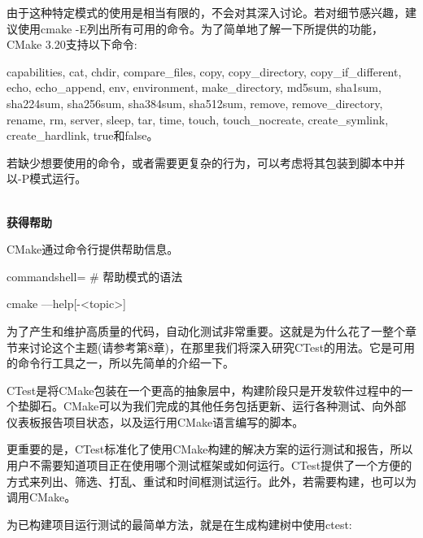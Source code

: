 由于这种特定模式的使用是相当有限的，不会对其深入讨论。若对细节感兴趣，建议使用cmake -E列出所有可用的命令。为了简单地了解一下所提供的功能，CMake 3.20支持以下命令:

capabilities, cat, chdir, compare\_files, copy, copy\_directory, copy\_if\_different, echo, echo\_append, env, environment, make\_directory, md5sum, sha1sum, sha224sum, sha256sum, sha384sum, sha512sum, remove, remove\_directory, rename, rm, server, sleep, tar, time, touch, touch\_nocreate, create\_symlink, create\_hardlink, true和false。
 
若缺少想要使用的命令，或者需要更复杂的行为，可以考虑将其包装到脚本中并以-P模式运行。

\hspace*{\fill} \\ %
\noindent
\textbf{获得帮助}

CMake通过命令行提供帮助信息。

\begin{tcblisting}{commandshell={}}
# 帮助模式的语法

cmake ––help[-<topic>]
\end{tcblisting}


为了产生和维护高质量的代码，自动化测试非常重要。这就是为什么花了一整个章节来讨论这个主题(请参考第8章)，在那里我们将深入研究CTest的用法。它是可用的命令行工具之一，所以先简单的介绍一下。

CTest是将CMake包装在一个更高的抽象层中，构建阶段只是开发软件过程中的一个垫脚石。CMake可以为我们完成的其他任务包括更新、运行各种测试、向外部仪表板报告项目状态，以及运行用CMake语言编写的脚本。

更重要的是，CTest标准化了使用CMake构建的解决方案的运行测试和报告，所以用户不需要知道项目正在使用哪个测试框架或如何运行。CTest提供了一个方便的方式来列出、筛选、打乱、重试和时间框测试运行。此外，若需要构建，也可以为调用CMake。

为已构建项目运行测试的最简单方法，就是在生成构建树中使用ctest:


